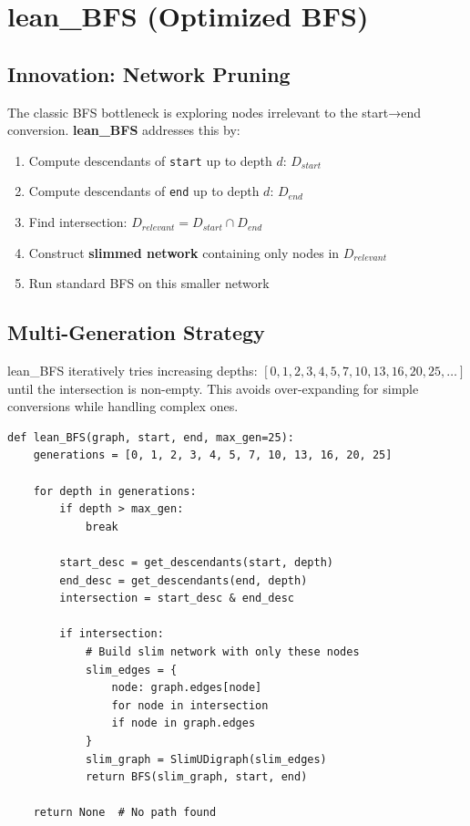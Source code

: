 \documentclass[11pt,a4paper]{report}
\begin{document}
\section{lean\_BFS (Optimized BFS)}

\subsection{Innovation: Network Pruning}

The classic BFS bottleneck is exploring nodes irrelevant to the start→end conversion. \textbf{lean\_BFS} addresses this by:
\begin{enumerate}[leftmargin=*]
  \item Compute descendants of \texttt{start} up to depth $d$: $D_{start}$
  \item Compute descendants of \texttt{end} up to depth $d$: $D_{end}$
  \item Find intersection: $D_{relevant} = D_{start} \cap D_{end}$
  \item Construct \textbf{slimmed network} containing only nodes in $D_{relevant}$
  \item Run standard BFS on this smaller network
\end{enumerate}

\subsection{Multi-Generation Strategy}

lean\_BFS iteratively tries increasing depths: $[0, 1, 2, 3, 4, 5, 7, 10, 13, 16, 20, 25, \ldots]$ until the intersection is non-empty. This avoids over-expanding for simple conversions while handling complex ones.

\begin{lstlisting}[style=pythonstyle, caption={lean\_BFS network filtering}]
def lean_BFS(graph, start, end, max_gen=25):
    generations = [0, 1, 2, 3, 4, 5, 7, 10, 13, 16, 20, 25]
    
    for depth in generations:
        if depth > max_gen:
            break
        
        start_desc = get_descendants(start, depth)
        end_desc = get_descendants(end, depth)
        intersection = start_desc & end_desc
        
        if intersection:
            # Build slim network with only these nodes
            slim_edges = {
                node: graph.edges[node] 
                for node in intersection 
                if node in graph.edges
            }
            slim_graph = SlimUDigraph(slim_edges)
            return BFS(slim_graph, start, end)
    
    return None  # No path found
\end{lstlisting}
\end{document}
